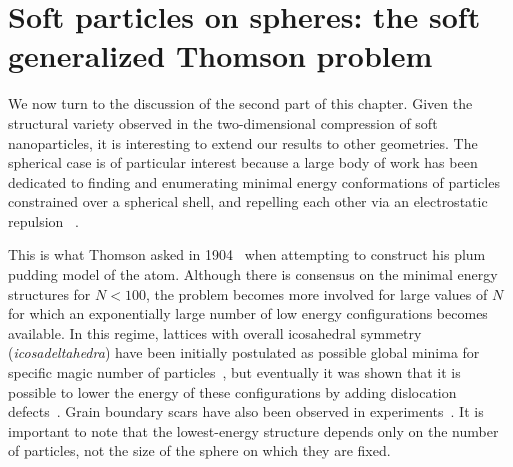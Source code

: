{\section{Soft particles on spheres: the soft generalized Thomson problem}\label{sec:thomson}

We now turn to the discussion of the second part of this chapter. Given the structural variety
observed in the two-dimensional compression of soft nanoparticles, it is interesting to 
extend our results to other geometries. The spherical case is of particular interest 
because a large body of work has been dedicated to finding and enumerating minimal 
energy conformations of particles constrained over a spherical shell, and 
repelling each other via an electrostatic repulsion ~\cite{altschuler, erber, perez-garrido, morris, erber2, edmundson, altschuler2, dodgson, perez-garrido2, perez-garrido3,Bowick2,Bowick3}.

This is what Thomson asked in 1904~\cite{thomson} when attempting to construct his plum pudding
model of the atom. Although there is consensus on the minimal energy structures for
$N<100$, the problem becomes more involved for large values of $N$ for which an exponentially large
number of low energy configurations becomes available.  In this regime, lattices with overall icosahedral
symmetry ({\it icosadeltahedra}) have been initially postulated as possible global minima for
specific magic number of particles~\cite{altschuler2},  but eventually 
it was shown that it is possible to lower the energy of these configurations by adding dislocation 
defects~\cite{perez-garrido3,Bowick}. Grain boundary scars have also been observed in
experiments~\cite{bausch}.
It is important to note that the lowest-energy structure depends only on the number of particles, not the size of the sphere on which they are fixed.
 
}
